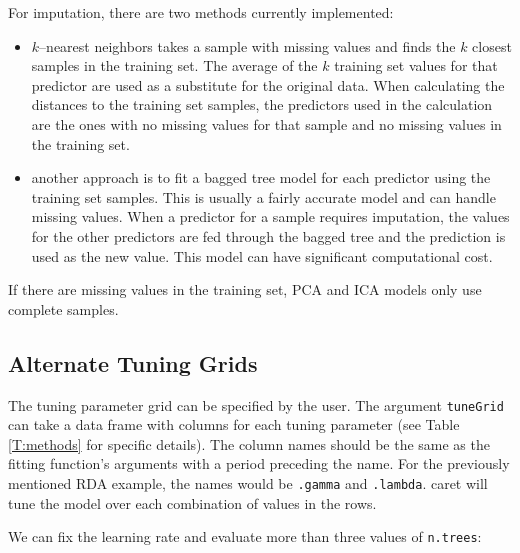 \documentclass[12pt]{article}
\newcommand{\code}[1]{\mbox{\footnotesize\color{darkblue}\texttt{#1}}}
\newcommand{\pkg}[1]{{\fontseries{b}\selectfont #1}}
\renewcommand{\pkg}[1]{{\textsf{#1}}}
\begin{document}
For imputation, there are two methods currently implemented:
\begin{itemize}
\item $k$--nearest neighbors takes a sample with missing values and
  finds the $k$ closest samples in the training set. The average of
  the $k$ training set values for that predictor are used as a
  substitute for the original data. When calculating the distances to
  the training set samples, the predictors used in the calculation are
  the ones with no missing values for that sample and no missing
  values in the training set.
\item another approach is to fit a bagged tree model for each
  predictor using the training set samples. This is usually a fairly
  accurate model and can handle missing values. When a predictor for a
  sample requires imputation, the values for the other predictors are
  fed through the bagged tree and the prediction is used as the new
  value. This model can have significant computational cost.
\end{itemize}

If there are missing values in the training set, PCA and ICA models
only use complete samples.


\subsection{Alternate Tuning Grids}\label{S:altTune}

The tuning parameter grid can be specified by the user. The argument
\code{tuneGrid} can take a data frame with columns for each tuning
parameter (see Table \ref{T:methods} for specific details). The column
names should be the same as the fitting function's arguments with a
period preceding the name. For the previously mentioned RDA example, the names would be
\code{.gamma} and \code{.lambda}. \pkg{caret} will tune the
model over each combination of values in the rows. 
 

We can fix the learning rate and evaluate more than three values of
\code{n.trees}: 
\end{document}
